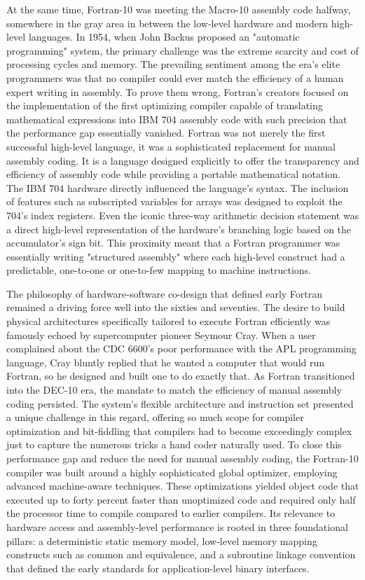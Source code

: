 At the same time, Fortran-10 was meeting the Macro-10 assembly code halfway, somewhere in the gray area in between the low-level hardware and modern high-level languages. In 1954, when John Backus proposed an "automatic programming" system, the primary challenge was the extreme scarcity and cost of processing cycles and memory. The prevailing sentiment among the era’s elite programmers was that no compiler could ever match the efficiency of a human expert writing in assembly. To prove them wrong, Fortran’s creators focused on the implementation of the first optimizing compiler capable of translating mathematical expressions into IBM 704 assembly code with such precision that the performance gap essentially vanished. Fortran was not merely the first successful high-level language, it was a sophisticated replacement for manual assembly coding. It is a language designed explicitly to offer the transparency and efficiency of assembly code while providing a portable mathematical notation. The IBM 704 hardware directly influenced the language's syntax. The inclusion of features such as subscripted variables for arrays was designed to exploit the 704’s index registers. Even the iconic three-way arithmetic decision statement was a direct high-level representation of the hardware's branching logic based on the accumulator's sign bit. This proximity meant that a Fortran programmer was essentially writing "structured assembly" where each high-level construct had a predictable, one-to-one or one-to-few mapping to machine instructions. 

The philosophy of hardware-software co-design that defined early Fortran remained a driving force well into the sixties and seventies. The desire to build physical architectures specifically tailored to execute Fortran efficiently was famously echoed by supercomputer pioneer Seymour Cray. When a user complained about the CDC 6600's poor performance with the APL programming language, Cray bluntly replied that he wanted a computer that would run Fortran, so he designed and built one to do exactly that. As Fortran transitioned into the DEC-10 era, the mandate to match the efficiency of manual assembly coding persisted. The system's flexible architecture and instruction set presented a unique challenge in this regard, offering so much scope for compiler optimization and bit-fiddling that compilers had to become exceedingly complex just to capture the numerous tricks a hand coder naturally used. To close this performance gap and reduce the need for manual assembly coding, the Fortran-10 compiler was built around a highly sophisticated global optimizer, employing advanced machine-aware techniques. These optimizations yielded object code that executed up to forty percent faster than unoptimized code and required only half the processor time to compile compared to earlier compilers. Its relevance to hardware access and assembly-level performance is rooted in three foundational pillars: a deterministic static memory model, low-level memory mapping constructs such as common and equivalence, and a subroutine linkage convention that defined the early standards for application-level binary interfaces. 

